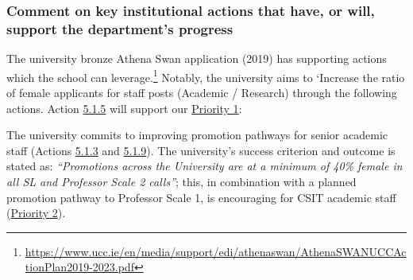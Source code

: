 \subsubsection{Comment on key institutional actions that have, or will, support the department’s progress}

The university bronze Athena Swan application (2019) has supporting actions which the school can leverage.\footnote{\url{https://www.ucc.ie/en/media/support/edi/athenaswan/AthenaSWANUCCActionPlan2019-2023.pdf}} 
Notably, the university aims to ‘Increase the ratio of female applicants for staff posts (Academic / Research) through the following actions. 
Action \hyperlink{act515}{5.1.5} will support our \hyperlink{priority:1}{Priority 1}:




The university commits to improving promotion pathways for senior academic staff (Actions \hyperlink{act513}{5.1.3} and \hyperlink{act519}{5.1.9}).  The university's success criterion and outcome is stated as: \textit{``Promotions across the University are at a minimum of 40\% female in all SL and Professor Scale 2 calls''}; this, in combination with a planned promotion pathway to Professor Scale 1,
is encouraging for CSIT academic staff (\hyperlink{priority:2}{Priority 2}). 



